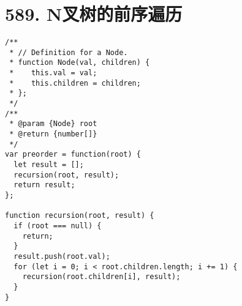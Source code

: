 \newpage
\section{589. N叉树的前序遍历}
\label{leetcode:589}

\begin{verbatim}
/**
 * // Definition for a Node.
 * function Node(val, children) {
 *    this.val = val;
 *    this.children = children;
 * };
 */
/**
 * @param {Node} root
 * @return {number[]}
 */
var preorder = function(root) {
  let result = [];
  recursion(root, result);
  return result;
};

function recursion(root, result) {
  if (root === null) {
    return;
  }
  result.push(root.val);
  for (let i = 0; i < root.children.length; i += 1) {
    recursion(root.children[i], result);
  }
}
\end{verbatim}